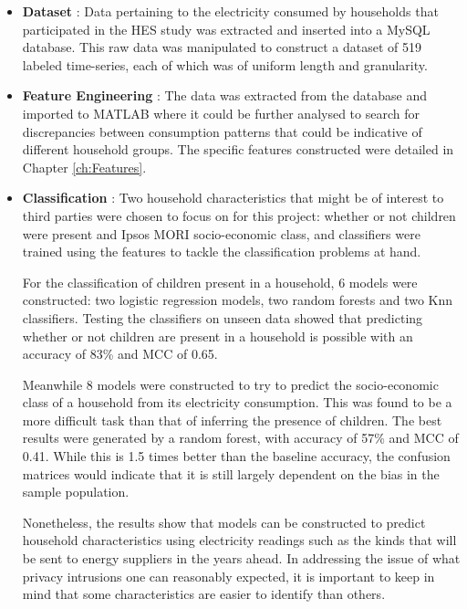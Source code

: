 \begin{itemize}

\item \textbf{Dataset} : Data pertaining to the electricity consumed by households that participated in the HES study was extracted and inserted into a MySQL database. This raw data was manipulated to construct a dataset of 519 labeled time-series, each of which was of uniform length and granularity.

\item \textbf{Feature Engineering} : The data was extracted from the database and imported to MATLAB where it could be further analysed to search for discrepancies between consumption patterns that could be indicative of different household groups. The specific features constructed were detailed in Chapter \ref{ch:Features}.

\item \textbf{Classification} : Two household characteristics that might be of interest to third parties were chosen to focus on for this project:  whether or not children were present and Ipsos MORI socio-economic class, and classifiers were trained using the features to tackle the classification problems at hand. 

For the classification of children present in a household, 6 models were constructed: two logistic regression models, two random forests and two Knn classifiers. Testing the classifiers on unseen data showed that predicting whether or not children are present in a household is possible with an accuracy of 83\% and MCC of 0.65. 

Meanwhile 8 models were constructed to try to predict the socio-economic class of a household from its electricity consumption. This was found to be a more difficult task than that of inferring the presence of children. The best results were generated by a random forest, with accuracy of 57\% and MCC of 0.41. While this is 1.5 times better than the baseline accuracy, the confusion matrices would indicate that it is still largely dependent on the bias in the sample population. 

Nonetheless, the results show that models can be constructed to predict household characteristics using electricity readings such as the kinds that will be sent to energy suppliers in the years ahead. In addressing the issue of what privacy intrusions one can reasonably expected, it is important to keep in mind that some characteristics are easier to identify than others.
\end{itemize}

